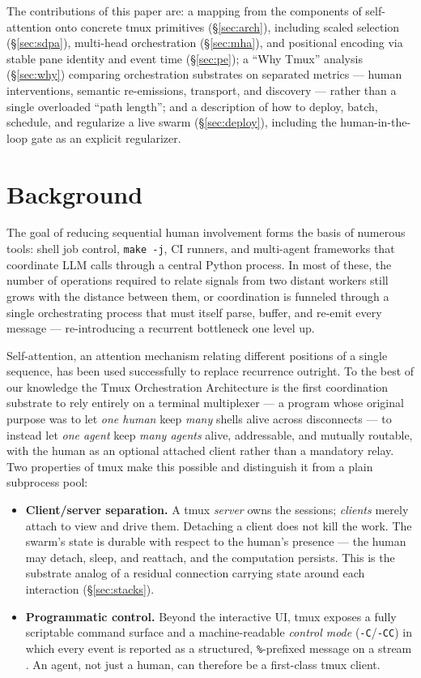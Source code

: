 \documentclass[10pt]{article}
\newcommand{\code}[1]{\texttt{\small #1}}
\begin{document}
The contributions of this paper are: a mapping from the components of self-attention
onto concrete tmux primitives (\S\ref{sec:arch}), including scaled selection
(\S\ref{sec:sdpa}), multi-head orchestration (\S\ref{sec:mha}), and positional
encoding via stable pane identity and event time (\S\ref{sec:pe}); a ``Why Tmux''
analysis (\S\ref{sec:why}) comparing orchestration substrates on separated metrics
--- human interventions, semantic re-emissions, transport, and discovery --- rather
than a single overloaded ``path length''; and a description of how
to deploy, batch, schedule, and regularize a live swarm (\S\ref{sec:deploy}),
including the human-in-the-loop gate as an explicit regularizer.

\section{Background}

The goal of reducing sequential human involvement forms the basis of numerous tools:
shell job control, \code{make -j}, CI runners, and multi-agent frameworks that
coordinate LLM calls through a central Python process. In most of these, the number
of operations required to relate signals from two distant workers still grows with
the distance between them, or coordination is funneled through a single orchestrating
process that must itself parse, buffer, and re-emit every message --- re-introducing a
recurrent bottleneck one level up.

Self-attention, an attention mechanism relating different positions of a single
sequence, has been used successfully to replace recurrence outright. To the best of
our knowledge the Tmux Orchestration Architecture is the first coordination substrate
to rely entirely on a terminal multiplexer --- a program whose original purpose was to
let \emph{one human} keep \emph{many} shells alive across disconnects --- to instead
let \emph{one agent} keep \emph{many agents} alive, addressable, and mutually
routable, with the human as an optional attached client rather than a mandatory
relay. Two properties of tmux make this possible and distinguish it from a plain
subprocess pool:

\begin{itemize}
\item \textbf{Client/server separation.} A tmux \emph{server} owns the sessions;
\emph{clients} merely attach to view and drive them. Detaching a client does not kill
the work. The swarm's state is durable with respect to the human's presence --- the
human may detach, sleep, and reattach, and the computation persists. This is the
substrate analog of a residual connection carrying state around each interaction
(\S\ref{sec:stacks}).
\item \textbf{Programmatic control.} Beyond the interactive UI, tmux exposes a fully
scriptable command surface and a machine-readable \emph{control mode}
(\code{-C}/\code{-CC}) in which every event is reported as a structured,
\code{\%}-prefixed message on a stream \cite{tmuxcontrol}. An agent, not just a human,
can therefore be a first-class tmux client.
\end{itemize}
\end{document}
